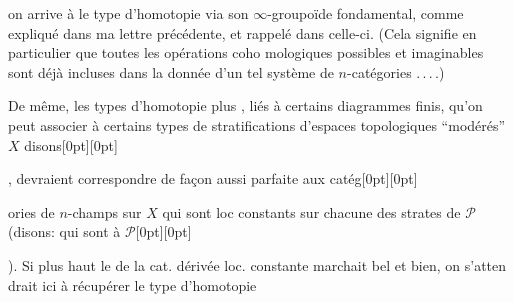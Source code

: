 %
on arrive à  le type d'homotopie
via son $\infty$-groupoïde fondamental, comme
expliqué dans ma lettre précédente, et
rappelé dans celle-ci. (Cela signifie en
particulier que toutes les opérations coho%
mologiques possibles et imaginables sont
déjà incluses dans la donnée d'un
tel système de $n$-catégories .\,.\,.\,.) 

De même, les types d'homotopie plus
, liés à certains diagrammes finis,
qu'on peut associer à certains types
de stratifications  d'espaces topologiques
``modérés'' $X$ disons\raisebox{0pt}[0pt][0pt]{\parbox{0pt}{}}, devraient correspondre de
façon aussi parfaite aux catég\raisebox{0pt}[0pt][0pt]{\parbox{0pt}{}}ories de $n$-champs
sur $X$ qui sont loc constants sur chacune des
strates de $\mathcal P$ (disons: qui sont  à $\mathcal P$\raisebox{0pt}[0pt][0pt]{\parbox{0pt}{}}).
Si plus haut le  de la cat. dérivée loc.
constante marchait bel et bien, on s'atten%
drait ici à récupérer le type d'homotopie
